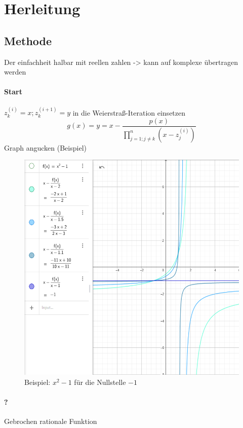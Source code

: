 \documentclass{article}
\begin{document}
\section{Herleitung}

\subsection{Methode}
Der einfachheit halbar mit reellen zahlen -> kann auf komplexe übertragen werden
\paragraph{Start}
$z_k^{(i)} = x;z_k^{(i+1)} = y$ in die Weierstraß-Iteration einsetzen 
\begin{equation}
    g(x) = y = x - \frac{p(x)}{\prod_{j=1;j\neq k}^{n} (x-z_j^{(i)})}
\end{equation}
Graph angucken (Beispiel)
\begin{figure}[h]
    \centering
    \includegraphics[scale=.6]{BeispielHerleitung.png}
    \caption{Beispiel: $x^2-1$ für die Nullstelle $-1$}
\end{figure}
\paragraph{?}
Gebrochen rationale Funktion
\end{document}
